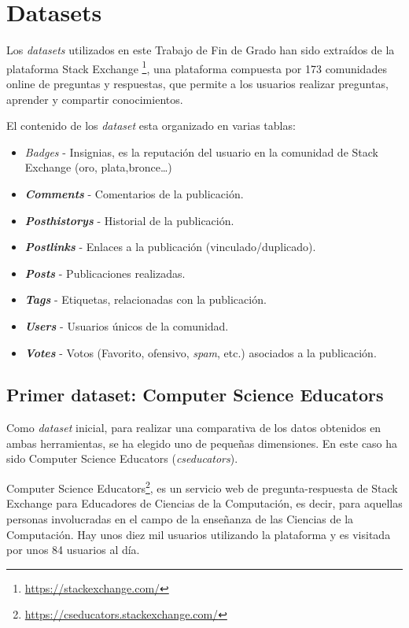 \documentclass[a4paper, 12pt]{book}
\begin{document}
\clearpage

\section{Datasets}
\label{sec:datasets}

Los \textit{datasets} utilizados en este Trabajo de Fin de Grado han sido extraídos de la plataforma Stack Exchange \footnote{\url{https://stackexchange.com/}}, una plataforma compuesta por 173 comunidades online de preguntas y respuestas, que permite a los usuarios realizar preguntas, aprender y compartir conocimientos.

El contenido de los \textit{dataset} esta organizado en varias tablas: 
 \begin{itemize}
        \item \emph{Badges} - Insignias, es la reputación del usuario en la comunidad de Stack Exchange (oro, plata,bronce\ldots)
        \item \textbf{\emph{Comments}} - Comentarios de la publicación.
        \item \textbf{\emph{Posthistorys}} - Historial de la publicación.
        \item \textbf{\emph{Postlinks}} - Enlaces a la publicación (vinculado/duplicado).
        \item \textbf{\emph{Posts}} - Publicaciones realizadas.
        \item \textbf{\emph{Tags}} - Etiquetas, relacionadas con la publicación.
        \item \textbf{\emph{Users}} - Usuarios únicos de la comunidad. 
        \item \textbf{\emph{Votes}} - Votos (Favorito, ofensivo, \emph{spam}, etc.) asociados a la publicación. 
    \end{itemize}

\subsection{Primer dataset: Computer Science Educators}
\label{sec:cseducators} 
Como \textit{dataset} inicial, para realizar una comparativa de los datos obtenidos en ambas herramientas, se ha elegido uno de pequeñas dimensiones. En este caso ha sido Computer Science Educators (\emph{cseducators}).

Computer Science Educators\footnote{\url{https://cseducators.stackexchange.com/}}, es un servicio web de pregunta-respuesta de Stack Exchange para Educadores de Ciencias de la Computación, es decir, para aquellas personas involucradas en el campo de la enseñanza de las Ciencias de la Computación. Hay unos diez mil usuarios utilizando la plataforma y es visitada por unos 84 usuarios al día. 
\end{document}
